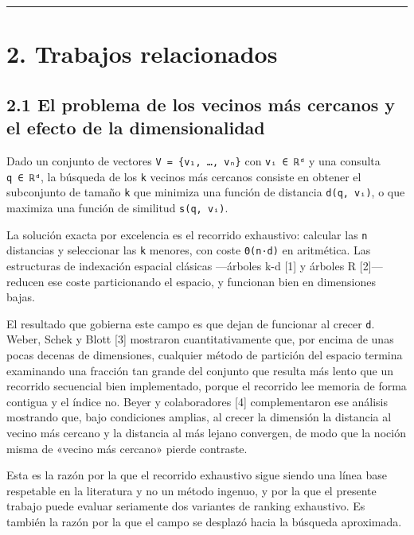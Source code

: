 \documentclass[11pt,a4paper]{article}
\let\pandocsubsection\subsection
\let\subsection\section
\let\subsubsection\pandocsubsection
\begin{document}
\begin{center}\rule{0.5\linewidth}{0.5pt}\end{center}

\subsection{2. Trabajos relacionados}\label{2-trabajos-relacionados}

\subsubsection{2.1 El problema de los vecinos más cercanos y el efecto
de la
dimensionalidad}\label{21-el-problema-de-los-vecinos-muxe1s-cercanos-y-el-efecto-de-la-dimensionalidad}

Dado un conjunto de vectores \texttt{V\ =\ \{v₁,\ …,\ vₙ\}} con
\texttt{vᵢ\ ∈\ ℝᵈ} y una consulta \texttt{q\ ∈\ ℝᵈ}, la búsqueda de los
\texttt{k} vecinos más cercanos consiste en obtener el subconjunto de
tamaño \texttt{k} que minimiza una función de distancia
\texttt{d(q,\ vᵢ)}, o que maximiza una función de similitud
\texttt{s(q,\ vᵢ)}.

La solución exacta por excelencia es el recorrido exhaustivo: calcular
las \texttt{n} distancias y seleccionar las \texttt{k} menores, con
coste \texttt{Θ(n·d)} en aritmética. Las estructuras de indexación
espacial clásicas ---árboles k-d {[}1{]} y árboles R {[}2{]}--- reducen
ese coste particionando el espacio, y funcionan bien en dimensiones
bajas.

El resultado que gobierna este campo es que dejan de funcionar al crecer
\texttt{d}. Weber, Schek y Blott {[}3{]} mostraron cuantitativamente
que, por encima de unas pocas decenas de dimensiones, cualquier método
de partición del espacio termina examinando una fracción tan grande del
conjunto que resulta más lento que un recorrido secuencial bien
implementado, porque el recorrido lee memoria de forma contigua y el
índice no. Beyer y colaboradores {[}4{]} complementaron ese análisis
mostrando que, bajo condiciones amplias, al crecer la dimensión la
distancia al vecino más cercano y la distancia al más lejano convergen,
de modo que la noción misma de «vecino más cercano» pierde contraste.

Esta es la razón por la que el recorrido exhaustivo sigue siendo una
línea base respetable en la literatura y no un método ingenuo, y por la
que el presente trabajo puede evaluar seriamente dos variantes de
ranking exhaustivo. Es también la razón por la que el campo se desplazó
hacia la búsqueda aproximada.
\end{document}
